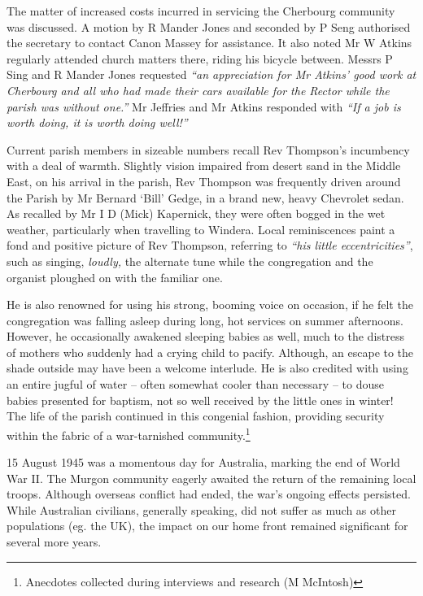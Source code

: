 The matter of increased costs incurred in servicing the Cherbourg community was discussed. A motion by R Mander Jones and seconded by P Seng authorised the secretary to contact Canon Massey for assistance. It also noted Mr W Atkins regularly attended church matters there, riding his bicycle between. Messrs P Sing and R Mander Jones requested \emph{``an appreciation for Mr Atkins' good work at Cherbourg and all who had made their cars available for the Rector while the parish was without one.''} Mr Jeffries and Mr Atkins responded with \emph{``If a job is worth doing, it is worth doing well!''}



Current parish members in sizeable numbers recall Rev Thompson's incumbency with a deal of warmth. Slightly vision impaired from desert sand in the Middle East, on his arrival in the parish, Rev Thompson was frequently driven around the Parish by Mr Bernard `Bill' Gedge, in a brand new, heavy Chevrolet sedan. As recalled by Mr I D (Mick) Kapernick, they were often bogged in the wet weather, particularly when travelling to Windera. Local reminiscences paint a fond and positive picture of Rev Thompson, referring to \emph{``his little eccentricities''}, such as singing, \emph{loudly,} the alternate tune while the congregation and the organist ploughed on with the familiar one.



He is also renowned for using his strong, booming voice on occasion, if he felt the congregation was falling asleep during long, hot services on summer afternoons. However, he occasionally awakened sleeping babies as well, much to the distress of mothers who suddenly had a crying child to pacify. Although, an escape to the shade outside may have been a welcome interlude. He is also credited with using an entire jugful of water -- often somewhat cooler than necessary -- to douse babies presented for baptism, not so well received by the little ones in winter! The life of the parish continued in this congenial fashion, providing security within the fabric of a war-tarnished community.\footnote{Anecdotes collected during interviews and research (M McIntosh)}


15 August 1945 was a momentous day for Australia, marking the end of World War II. The Murgon community eagerly awaited the return of the remaining local troops. Although overseas conflict had ended, the war's ongoing effects persisted. While Australian civilians, generally speaking, did not suffer as much as other populations (eg. the UK), the impact on our home front remained significant for several more years.









